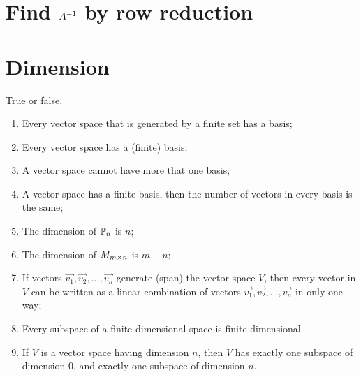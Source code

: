\section{Find $A^{-1}$ by row reduction}
\section{Dimension}

\begin{exercise}
  True or false.
  \begin{enumerate}
    \item Every vector space that is generated by a finite set has a basis;
    \item Every vector space has a (finite) basis;
    \item A vector space cannot have more that one basis;
    \item A vector space has a finite basis, then the number of vectors
      in every basis is the same;
    \item The dimension of $\P_n$ is $n$;
    \item The dimension of $M_{m\times n}$ is $m+n$;
    \item If vectors $\vec{v_1},\vec{v_2},\dots,\vec{v_n}$ generate (span)
      the vector space $V$, then every vector in $V$ can be written as
      a linear combination of vectors $\vec{v_1},\vec{v_2},\dots,\vec{v_n}$
      in only one way;
    \item Every subspace of a finite-dimensional space is finite-dimensional.
    \item If $V$ is a vector space having dimension $n$, then $V$ has exactly
      one subspace of dimension $0$, and exactly one subspace of dimension
      $n$.
  \end{enumerate}
\end{exercise}
